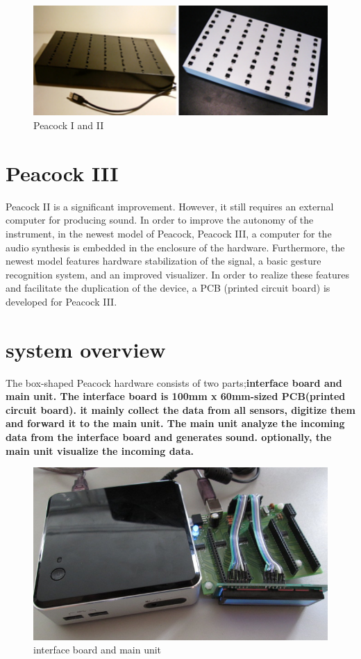 \documentclass{nime-alternate}
\begin{document}
\begin{figure}[h]
       \centering
       \includegraphics[width=1\columnwidth]{peacocks}
       \caption{Peacock I and II}
       \label{fig:old_peacock}
\end{figure}

\section{Peacock III}

Peacock II is a significant improvement. However, it still requires an external computer for producing sound. 
In order to improve the autonomy of the instrument, in the newest model of Peacock, Peacock III, a computer for the audio synthesis is embedded in the enclosure of the hardware. Furthermore, the newest model features hardware stabilization of the signal, a basic gesture recognition system, and an improved visualizer. In order to realize these features and facilitate the duplication of the device, a PCB (printed circuit board) is developed for Peacock III.

\section{system overview} %

The box-shaped Peacock hardware consists of two parts;\bf{interface board} and \bf{main unit}.
The interface board is 100mm x 60mm-sized PCB(printed circuit board). it mainly collect the data from all sensors, digitize them and forward it to the main unit. The main unit analyze the incoming data from the interface board and generates sound. optionally, the main unit visualize the incoming data.

\begin{figure}[htbp]
       \centering
              \includegraphics[width=1\columnwidth]{interface_main}
       \caption{interface board and main unit}
       \label{fig:interface_main}
\end{figure}
\end{document}
